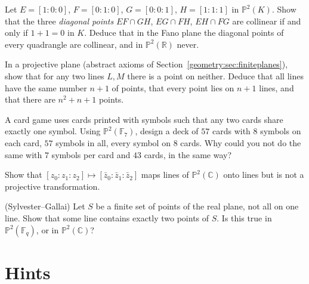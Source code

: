 \begin{exercise}[$\star$]\label{geometry:ex:fanodiag}
Let $E=[1:0:0]$, $F=[0:1:0]$, $G=[0:0:1]$, $H=[1:1:1]$ in $\mathbb P^2(K)$. Show that the three \emph{diagonal points} $EF\cap GH$,
$EG\cap FH$, $EH\cap FG$ are collinear if and only if $1+1=0$ in $K$. Deduce that in the Fano plane the diagonal points of every quadrangle
are collinear, and in $\mathbb P^2(\mathbb R)$ never.
\end{exercise}

\begin{exercise}[$\star\star$]\label{geometry:ex:planeorder}
In a projective plane (abstract axioms of Section~\ref{geometry:sec:finiteplanes}), show that for any two lines $L,M$ there is a point on neither. Deduce
that all lines have the same number $n+1$ of points, that every point lies on $n+1$ lines, and that there are $n^2+n+1$ points.
\end{exercise}

\begin{exercise}[$\star\star$]\label{geometry:ex:dobble}
A card game uses cards printed with symbols such that any two cards share exactly one symbol. Using $\mathbb P^2(\mathbb F_7)$, design a
deck of $57$ cards with $8$ symbols on each card, $57$ symbols in all, every symbol on $8$ cards. Why could you not do the same with $7$
symbols per card and $43$ cards, in the same way?
\end{exercise}

\begin{exercise}[$\star\star$]\label{geometry:ex:complexcollineation}
Show that $[z_0:z_1:z_2]\mapsto[\bar z_0:\bar z_1:\bar z_2]$ maps lines of $\mathbb P^2(\mathbb C)$ onto lines but is not a projective
transformation.
\end{exercise}

\begin{exercise}[$\star\star\star$]\label{geometry:ex:sylvestergallai}
(Sylvester--Gallai) Let $S$ be a finite set of points of the real plane, not all on one line. Show that some line contains exactly two points of
$S$. Is this true in $\mathbb P^2(\mathbb F_q)$, or in $\mathbb P^2(\mathbb C)$?
\end{exercise}

\section{Hints}

